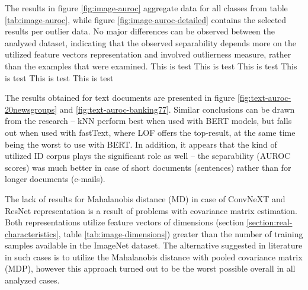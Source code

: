 The results in figure \ref{fig:image-auroc} aggregate data for all classes from table \ref{tab:image-auroc}, while figure \ref{fig:image-auroc-detailed} contains the selected results per outlier data. No major differences can be observed between the analyzed dataset, indicating that the observed separability depends more on the utilized feature vectors representation and involved outlierness measure, rather than the examples that were examined.
This is test This is test This is test This is test This is test This is test

The results obtained for text documents are presented in figure \ref{fig:text-auroc-20newsgroups} and \ref{fig:text-auroc-banking77}. Similar conclusions can be drawn from the research – kNN perform best when used with BERT models, but falls out when used with fastText, where LOF offers the top-result, at the same time being the worst to use with BERT. In addition, it appears that the kind of utilized ID corpus plays the significant role as well – the separability (AUROC scores) was much better in case of short documents (sentences) rather than for longer documents (e-mails).

The lack of results for Mahalanobis distance (MD) in case of ConvNeXT and ResNet representation is a result of problems with covariance matrix estimation. Both representations utilize feature vectors of dimensions (section \ref{section:real-characteristics}, table \ref{tab:image-dimensions}) greater than the number of training samples available in the ImageNet dataset. The alternative suggested in literature in such cases is to utilize the Mahalanobis distance with pooled covariance matrix (MDP), however this approach turned out to be the worst possible overall in all analyzed cases.

